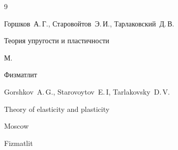 \begin{thebibliography}{9}

\by Горшков~А.\,Г., Старовойтов~Э.\,И., Тарлаковский~Д.\,В.

\book Теория упругости и пластичности

\publaddr М.

\publ Физматлит



\misctransl 

\by Gorshkov~A.\,G., Starovoytov~E.\,I, Tarlakovsky~D.\,V. 

\book Theory of elasticity and plasticity 

\publaddr Moscow

\publ Fizmatlit







\end{thebibliography}



\noindent

\hskip6.5cm \thedate \par\noindent

\hskip6.5cm\therevdate\par





\makeengtitlem



\newpage





%

